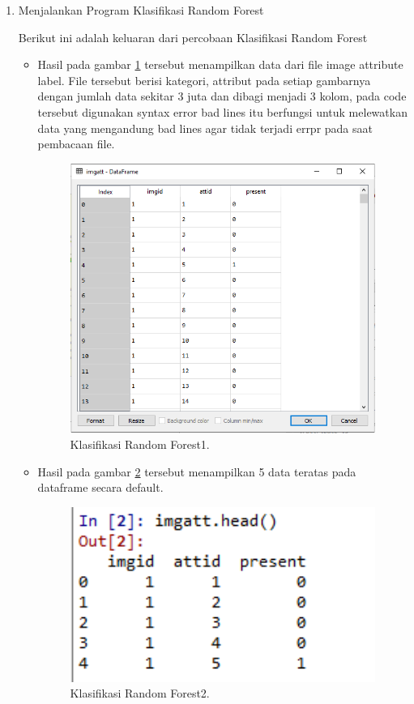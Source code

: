 \begin{enumerate}
\item Menjalankan Program Klasifikasi Random Forest \par
Berikut ini adalah keluaran dari percobaan Klasifikasi Random Forest
\begin{itemize}
\item Hasil pada gambar \ref{rons1} tersebut menampilkan data dari file image attribute label. File tersebut berisi kategori, attribut pada setiap gambarnya dengan jumlah data sekitar 3 juta dan dibagi menjadi 3 kolom, pada code tersebut digunakan syntax error bad lines itu berfungsi untuk melewatkan data yang mengandung bad lines agar tidak terjadi errpr pada saat pembacaan file.
		\begin{figure}[ht]
		\centerline{\includegraphics[width=1\textwidth]{figures/im/rons1.png}}
		\caption{Klasifikasi Random Forest1.}
		\label{rons1}
		\end{figure}

\item Hasil pada gambar \ref{rons2} tersebut menampilkan 5 data teratas pada dataframe secara default.
		\begin{figure}[ht]
		\centerline{\includegraphics[width=1\textwidth]{figures/im/rons2.png}}
		\caption{Klasifikasi Random Forest2.}
		\label{rons2}
		\end{figure}


\end{itemize}
\end{enumerate}
